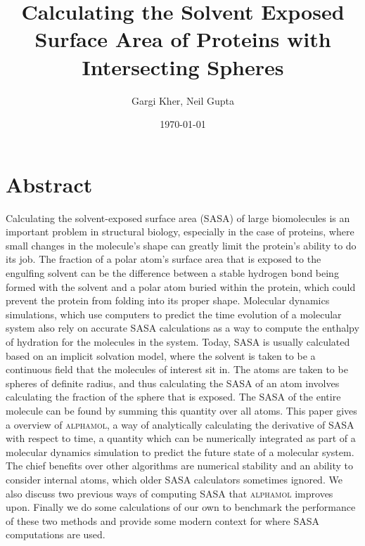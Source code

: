 \documentclass{article}
\title{Calculating the Solvent Exposed Surface Area of Proteins with Intersecting Spheres}
\author{Gargi Kher, Neil Gupta}
\date{\today}
\begin{document}
\maketitle
\tableofcontents
\newpage
\section{Abstract}
Calculating the solvent-exposed surface area (SASA) of large biomolecules is an important problem in structural biology, especially in the case of proteins, where small changes in the molecule's shape can greatly limit the protein's ability to do its job. The fraction of a polar atom's surface area that is exposed to the engulfing solvent can be the difference between a stable hydrogen bond being formed with the solvent and a polar atom buried within the protein, which could prevent the protein from folding into its proper shape. Molecular dynamics simulations, which use computers to predict the time evolution of a molecular system also rely on accurate SASA calculations as a way to compute the enthalpy of hydration for the molecules in the system. Today, SASA is usually calculated based on an implicit solvation model, where the solvent is taken to be a continuous field that the molecules of interest sit in. The atoms are taken to be spheres of definite radius, and thus calculating the SASA of an atom involves calculating the fraction of the sphere that is exposed. The SASA of the entire molecule can be found by summing this quantity over all atoms. This paper gives a overview of \textsc{alphamol}, a way of analytically calculating the derivative of SASA with respect to time, a quantity which can be numerically integrated as part of a molecular dynamics simulation to predict the future state of a molecular system. The chief benefits over other algorithms are numerical stability and an ability to consider internal atoms, which older SASA calculators sometimes ignored.\cite{Bryant} We also discuss two previous ways of computing SASA that \textsc{alphamol} improves upon. Finally we do some calculations of our own to benchmark the performance of these two methods and provide some modern context for where SASA computations are used.
\end{document}
